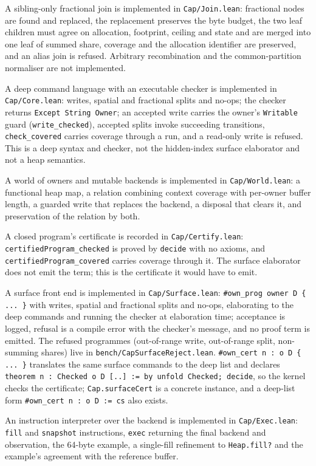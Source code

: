 \documentclass[10pt,a4paper]{article}
\newcommand{\file}[1]{\texttt{\small #1}}
\begin{document}
A sibling-only fractional join is implemented in \file{Cap/Join.lean}:
fractional nodes are found and replaced, the replacement preserves the byte budget,
the two leaf children must agree on allocation, footprint, ceiling and state and
are merged into one leaf of summed share, coverage and the allocation identifier are
preserved, and an alias join is refused. Arbitrary recombination and the
common-partition normaliser are not implemented.

A deep command language with an executable checker is implemented in
\file{Cap/Core.lean}: writes, spatial and fractional splits and no-ops; the checker
returns \texttt{Except String Owner}; an accepted write carries the owner's
\texttt{Writable} guard (\texttt{write\_checked}), accepted splits invoke
succeeding transitions, \texttt{check\_covered} carries coverage through a run,
and a read-only write is refused. This is a deep syntax and checker, not the
hidden-index surface elaborator and not a heap semantics.

A world of owners and mutable backends is implemented in \file{Cap/World.lean}:
a functional heap map, a relation combining context coverage with per-owner buffer
length, a guarded write that replaces the backend, a disposal that clears it, and
preservation of the relation by both.

A closed program's certificate is recorded in \file{Cap/Certify.lean}:
\texttt{certifiedProgram\_checked} is proved by \texttt{decide} with no axioms,
and \texttt{certifiedProgram\_covered} carries coverage through it. The surface
elaborator does not emit the term; this is the certificate it would have to emit.

A surface front end is implemented in \file{Cap/Surface.lean}:
\texttt{\#own\_prog owner D \{ ... \}} with writes, spatial and fractional
splits and no-ops, elaborating to the deep commands and running the checker at
elaboration time; acceptance is logged, refusal is a compile error with the
checker's message, and no proof term is emitted. The refused programmes
(out-of-range write, out-of-range split, non-summing shares) live in
\file{bench/CapSurfaceReject.lean}. \texttt{\#own\_cert n : o D \{ ... \}} translates the same surface commands to
the deep list and declares \texttt{theorem n : Checked o D [..] := by unfold
Checked; decide}, so the kernel checks the certificate; \texttt{Cap.surfaceCert} is
a concrete instance, and a deep-list form \texttt{\#own\_cert n : o D := cs} also
exists.

An instruction interpreter over the backend is implemented in
\file{Cap/Exec.lean}: \texttt{fill} and \texttt{snapshot} instructions,
\texttt{exec} returning the final backend and observation, the 64-byte example,
a single-fill refinement to \texttt{Heap.fill?} and the example's agreement with
the reference buffer.
\end{document}
